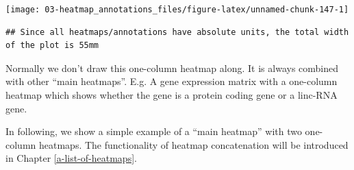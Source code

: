 \documentclass[]{book}
\theoremstyle{definition}
\theoremstyle{definition}
\theoremstyle{definition}
\theoremstyle{remark}
\begin{document}
\begin{center}\texttt{[image: 03-heatmap\_annotations\_files/figure-latex/unnamed-chunk-147-1]} \end{center}

\begin{verbatim}
## Since all heatmaps/annotations have absolute units, the total width of the plot is 55mm
\end{verbatim}

Normally we don't draw this one-column heatmap along. It is always
combined with other ``main heatmaps''. E.g. A gene expression matrix
with a one-column heatmap which shows whether the gene is a protein
coding gene or a linc-RNA gene.

In following, we show a simple example of a ``main heatmap'' with two
one-column heatmaps. The functionality of heatmap concatenation will be
introduced in Chapter \ref{a-list-of-heatmaps}.
\end{document}
